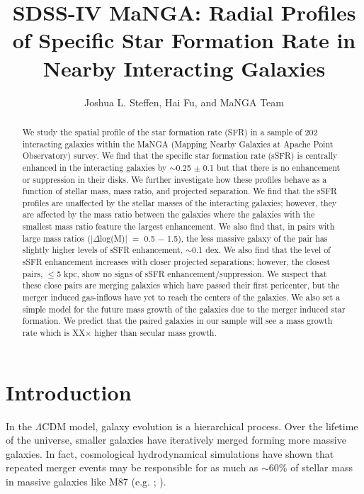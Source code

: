 \documentclass[iop,revtex4,twocolumn,apj,numberedappendix,appendixfloats]{emulateapj}
\begin{document}
\title{SDSS-IV MaNGA: Radial Profiles of Specific Star Formation Rate in Nearby Interacting Galaxies}

\author{
Joshua L. Steffen, 
Hai Fu, and 
MaNGA Team 
}

\begin{abstract}
We study the spatial profile of the star formation rate (SFR) in a sample of 202 interacting galaxies within the MaNGA (Mapping Nearby Galaxies at Apache Point Observatory) survey. We find that the specific star formation rate (sSFR) is centrally enhanced in the interacting galaxies by $\sim$0.25 $\pm$ 0.1 but that there is no enhancement or suppression in their disks. We further investigate how these profiles behave as a function of stellar mass, mass ratio, and projected separation. We find that the sSFR profiles are unaffected by the stellar masses of the interacting galaxies; however, they are affected by the mass ratio between the galaxies where the galaxies with the smallest mass ratio feature the largest enhancement. We also find that, in pairs with large mass ratios ($|\Delta$log(M)$|$ $=$ 0.5 $-$ 1.5), the less massive galaxy of the pair has slightly higher levels of sSFR enhancement, $\sim$0.1 dex. We also find that the level of sSFR enhancement increases with closer projected separations; however, the closest pairs, $\le$5 kpc, show no signs of sSFR enhancement/suppression. We suspect that these close pairs are merging galaxies which have passed their first pericenter, but the merger induced gas-inflows have yet to reach the centers of the galaxies. We also set a simple model for the future mass growth of the galaxies due to the merger induced star formation. We predict that the paired galaxies in our sample will see a mass growth rate which is XX$\times$ higher than secular mass growth. 
\end{abstract}


\section{Introduction}\label{sec:intro}

In the $\Lambda$CDM model, galaxy evolution is a hierarchical process. Over the lifetime of the universe, smaller galaxies have iteratively merged forming more massive galaxies. In fact, cosmological hydrodynamical simulations have shown that repeated merger events may be responsible for as much as $\sim$60\% of stellar mass in massive galaxies like M87 (e.g. \citet{Rodriguez-Gomez:2016}; \citet{Pillepich:2018}). 
\end{document}
